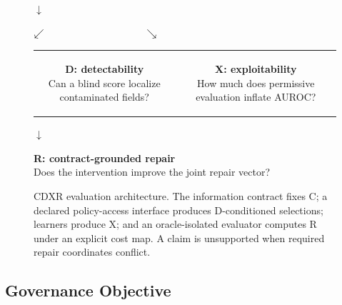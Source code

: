 \documentclass[sigconf,review]{acmart}
\begin{document}
\begin{figure}[t]
\centering
\setlength{\fboxsep}{5pt}
\par\vspace{2pt}$\downarrow$\par\vspace{2pt}
\par\vspace{2pt}$\swarrow\hspace{0.30\columnwidth}\searrow$\par\vspace{2pt}
\begin{tabular}{@{}cc@{}}
\colorbox{LBLavender!45}{\parbox{0.39\columnwidth}{\centering
\textbf{D: detectability}\\Can a blind score localize contaminated fields?}} &
\colorbox{LBCoral!35}{\parbox{0.39\columnwidth}{\centering
\textbf{X: exploitability}\\How much does permissive evaluation inflate AUROC?}}
\end{tabular}
\par\vspace{4pt}$\downarrow$\par\vspace{2pt}
\colorbox{LBSage!45}{\parbox{0.87\columnwidth}{\centering
\textbf{R: contract-grounded repair}\\Does the intervention improve the joint repair vector?}}
\caption{CDXR evaluation architecture. The information contract fixes C; a
declared policy-access interface produces D-conditioned selections; learners
produce X; and an oracle-isolated evaluator computes R under an explicit cost
map. A claim is unsupported when required repair coordinates conflict.}
\label{fig:architecture}
\end{figure}

\subsection{Governance Objective}
\end{document}

